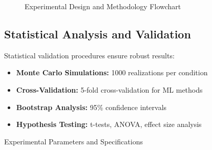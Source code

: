 \begin{figure}[h]
\centering
\caption{Experimental Design and Methodology Flowchart}
\label{fig:experimental_design}
\end{figure}

\subsection{Statistical Analysis and Validation}

Statistical validation procedures ensure robust results:

\begin{itemize}
    \item \textbf{Monte Carlo Simulations:} 1000 realizations per condition
    \item \textbf{Cross-Validation:} 5-fold cross-validation for ML methods
    \item \textbf{Bootstrap Analysis:} 95\% confidence intervals
    \item \textbf{Hypothesis Testing:} t-tests, ANOVA, effect size analysis
\end{itemize}

\begin{table}[h]
\centering
\caption{Experimental Parameters and Specifications}
\label{tab:experimental_parameters}
\end{table}
